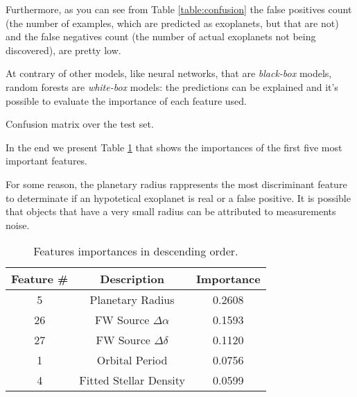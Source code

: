 \documentclass[11pt, a4paper]{article}
\begin{document}
  Furthermore, as you can see from Table \ref{table:confusion} the false positives count (the number of examples, which are predicted as exoplanets, but that are not) and the false negatives count (the number of actual exoplanets not being discovered), are pretty low.

  At contrary of other models, like neural networks, that are \textit{black-box} models, random forests are \textit{white-box} models: the predictions can be explained and it's possible to evaluate the importance of each feature used.

  \begin{table}
    \centering
    \caption{Confusion matrix over the test set.}
    \label{table:confusion}
  \end{table}

  In the end we present Table \ref{table:importances} that shows the importances of the first five most important features.

  For some reason, the planetary radius rappresents the most discriminant feature to determinate if an hypotetical exoplanet is real or a false positive.
  It is possible that objects that have a very small radius can be attributed to measurements noise.

  \begin{table}
    \centering
    \begin{tabular}{|c c c|}
      \hline
      Feature \# & Description & Importance \\
      \hline\hline
      5 & Planetary Radius & 0.2608 \\
      \hline
      26 & FW Source $\Delta\alpha$ & 0.1593 \\
      \hline
      27 & FW Source $\Delta\delta$ & 0.1120 \\
      \hline
      1 & Orbital Period & 0.0756 \\
      \hline
      4 & Fitted Stellar Density & 0.0599 \\
      \hline
    \end{tabular}
    \caption{Features importances in descending order.}
    \label{table:importances}
  \end{table}
\end{document}
